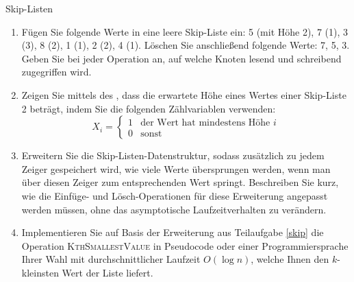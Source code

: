 \documentclass[11pt,a4paper]{article}
\begin{document}
\begin{aufgabe}{2}{Skip-Listen}
    \begin{enumerate}[label=\alph*)]
        \item Fügen Sie folgende Werte in eine leere Skip-Liste ein:
        5 (mit Höhe 2), 7 (1), 3 (3), 8 (2), 1 (1), 2 (2), 4 (1).
        Löschen Sie anschließend folgende Werte: 7, 5, 3.
        Geben Sie bei jeder Operation an, auf welche Knoten lesend und schreibend zugegriffen wird.
        \item Zeigen Sie mittels des , dass die erwartete Höhe eines Wertes einer Skip-Liste 2 beträgt, indem Sie die folgenden Zählvariablen verwenden:
        \begin{equation*}
            X_i = \begin{cases}
                1 & \text{der Wert hat mindestens Höhe $i$} \\
                0 & \text{sonst}
            \end{cases}
        \end{equation*}
        \item\label{skip} 
        Erweitern Sie die Skip-Listen-Datenstruktur, sodass zusätzlich zu jedem Zeiger gespeichert wird, wie viele Werte übersprungen werden, wenn man über diesen Zeiger zum entsprechenden Wert springt.
        Beschreiben Sie kurz, wie die Einfüge- und Lösch-Operationen für diese Erweiterung angepasst werden müssen, ohne das asymptotische Laufzeitverhalten zu verändern.

        \item 
        \hard Implementieren Sie auf Basis der Erweiterung aus Teilaufgabe \ref*{skip} die Operation \textsc{KthSmallestValue} in Pseudocode oder einer Programmiersprache Ihrer Wahl mit durchschnittlicher Laufzeit $O(\log n)$, welche Ihnen den $k$-kleinsten Wert der Liste liefert.
    \end{enumerate}
\end{aufgabe}
\end{document}
